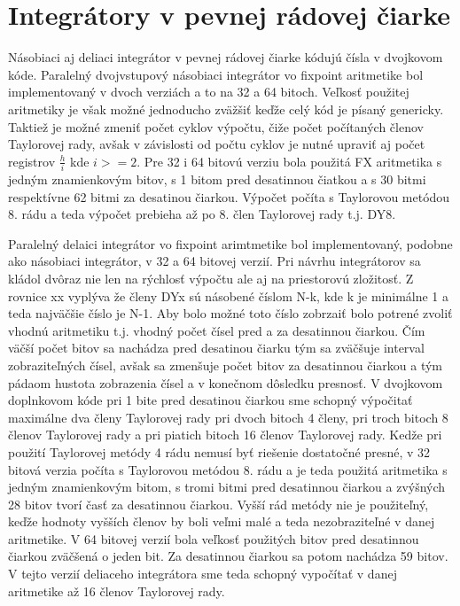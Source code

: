 \section{Integrátory v pevnej rádovej čiarke}
Násobiaci aj deliaci integrátor v pevnej rádovej čiarke kódujú čísla v dvojkovom kóde.
Paralelný dvojvstupový násobiaci integrátor vo fixpoint aritmetike bol implementovaný v dvoch verziách a to na 32 a 64 bitoch. Veľkosť použitej aritmetiky je však možné jednoducho zväžšiť keďže celý kód je písaný genericky. Taktiež je možné zmeniť počet cyklov výpočtu, čiže počet počítaných členov Taylorovej rady, avšak v závislosti od počtu cyklov je nutné upraviť aj počet registrov $ \frac{h}{i} $ kde $ i >= 2 $.
Pre 32 i 64 bitovú verziu bola použitá FX aritmetika s jedným znamienkovým bitov, s 1 bitom pred desatinnou čiatkou a s 30 bitmi respektívne 62 bitmi za desatinou čiarkou. Výpočet počíta s Taylorovou metódou 8. rádu a teda výpočet prebieha až po 8. člen Taylorovej rady t.j. DY8.


Paralelný delaici integrátor vo fixpoint arimtmetike bol implementovaný, podobne ako násobiaci integrátor, v 32 a 64 bitovej verzií. Pri návrhu integrátorov sa kládol dvôraz nie len na rýchlosť výpočtu ale aj na priestorovú zložitosť. 
Z rovnice xx vyplýva že členy DYx sú násobené číslom N-k, kde k je minimálne 1 a teda najväčšie číslo je N-1. Aby bolo možné toto číslo zobrzaiť bolo potrené zvoliť vhodnú aritmetiku t.j. vhodný počet čísel pred a za desatinnou čiarkou. Čím väčší počet bitov sa nachádza pred desatinou čiarku tým sa zväčšuje interval zobraziteľných čísel, avšak sa zmenšuje počet bitov za desatinnou čiarkou a tým pádaom hustota zobrazenia čísel a v konečnom dôsledku presnosť. V dvojkovom doplnkovom kóde pri 1 bite pred desatinou čiarkou sme schopný výpočitať maximálne dva členy Taylorovej rady pri dvoch bitoch 4 členy, pri troch bitoch 8 členov Taylorovej rady a pri piatich bitoch 16 členov Taylorovej rady. Kedže pri použití Taylorovej metódy 4 rádu nemusí byť riešenie dostatočné presné, v 32 bitová verzia počíta s Taylorovou metódou 8. rádu a je teda použitá aritmetika s jedným znamienkovým bitom, s tromi bitmi pred desatinnou čiarkou a zvýšných 28 bitov tvorí časť za desatinnou čiarkou. Vyšší rád metódy nie je použiteľný, keďže hodnoty vyšších členov by boli veľmi malé a teda nezobraziteľné v danej aritmetike. 
V 64 bitovej verzií bola veľkosť použitých bitov pred desatinnou čiarkou zväčšená o jeden bit. Za desatinnou čiarkou sa potom nachádza 59 bitov. V tejto verzií deliaceho integrátora sme teda schopný vypočítať v danej aritmetike až 16 členov Taylorovej rady.


